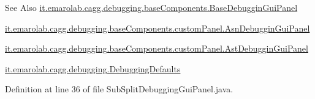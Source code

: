 \begin{DoxySeeAlso}{See Also}
\hyperlink{classit_1_1emarolab_1_1cagg_1_1debugging_1_1baseComponents_1_1BaseDebugginGuiPanel}{it.\-emarolab.\-cagg.\-debugging.\-base\-Components.\-Base\-Debuggin\-Gui\-Panel} 

\hyperlink{classit_1_1emarolab_1_1cagg_1_1debugging_1_1baseComponents_1_1customPanel_1_1AsnDebugginGuiPanel}{it.\-emarolab.\-cagg.\-debugging.\-base\-Components.\-custom\-Panel.\-Asn\-Debuggin\-Gui\-Panel} 

\hyperlink{classit_1_1emarolab_1_1cagg_1_1debugging_1_1baseComponents_1_1customPanel_1_1AstDebugginGuiPanel}{it.\-emarolab.\-cagg.\-debugging.\-base\-Components.\-custom\-Panel.\-Ast\-Debuggin\-Gui\-Panel} 

\hyperlink{classit_1_1emarolab_1_1cagg_1_1debugging_1_1DebuggingDefaults}{it.\-emarolab.\-cagg.\-debugging.\-Debugging\-Defaults} 
\end{DoxySeeAlso}


Definition at line 36 of file Sub\-Split\-Debugging\-Gui\-Panel.\-java.



